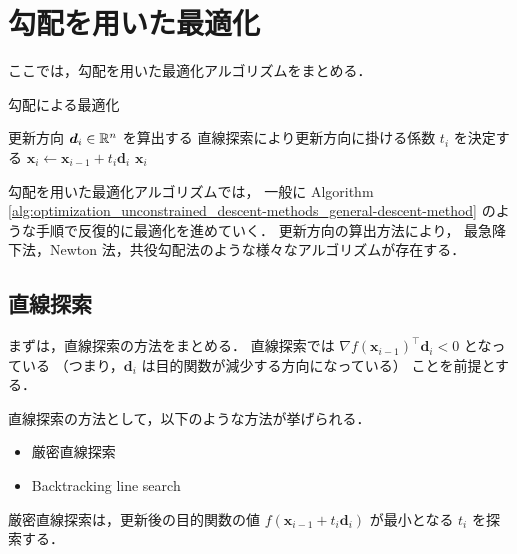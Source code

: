 %

\section{勾配を用いた最適化}

ここでは，勾配を用いた最適化アルゴリズムをまとめる．

\begin{algorithm}[tp]
    \caption{勾配による最適化}
    \label{alg:optimization_unconstrained_descent-methods_general-descent-method}
    \begin{algorithmic}
                \State 更新方向 $\bm{d}_i \in \mathbb{R}^n$ を算出する
                \State 直線探索により更新方向に掛ける係数 $t_i$ を決定する
                \State $\bm{x}_i \gets \bm{x}_{i-1} + t_i \bm{d}_i$
                    \State \Return $\bm{x}_i$
                \EndIf
            \EndFor
        \EndProcedure
    \end{algorithmic}
\end{algorithm}

勾配を用いた最適化アルゴリズムでは，
一般に
Algorithm \ref{alg:optimization_unconstrained_descent-methods_general-descent-method}
のような手順で反復的に最適化を進めていく．
更新方向の算出方法により，
最急降下法，Newton 法，共役勾配法のような様々なアルゴリズムが存在する．

\subsection{直線探索}

まずは，直線探索の方法をまとめる．
直線探索では
$\nabla f(\bm{x}_{i-1})^\top \bm{d}_i < 0$ となっている
（つまり，$\bm{d}_i$ は目的関数が減少する方向になっている）
ことを前提とする．

直線探索の方法として，以下のような方法が挙げられる．

\begin{itemize}
    \item 厳密直線探索
    \item Backtracking line search
\end{itemize}

厳密直線探索は，更新後の目的関数の値
$f(\bm{x}_{i-1} + t_i \bm{d}_i)$
が最小となる $t_i$ を探索する．

